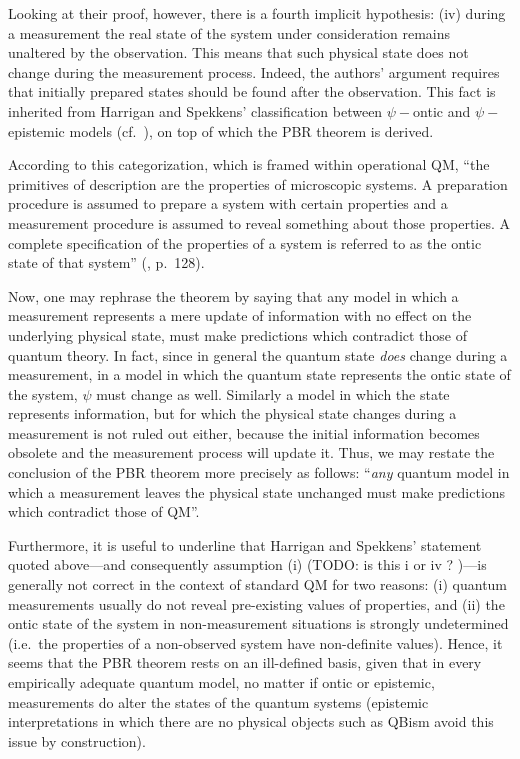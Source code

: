 \documentclass[aps,twocolumn,showpacs,preprintnumbers]{revtex4}
\begin{document}
	Looking at their proof, however, there is a fourth implicit hypothesis: (iv) during a measurement the real state of the system under consideration remains unaltered by the observation. This means that such physical state does not change during the measurement process. Indeed, the authors' argument requires that initially prepared states should be found after the observation. This fact is inherited from Harrigan and Spekkens' classification between $\psi-$ontic and $\psi-$epistemic models (cf.\ \cite{Harrigan:2010}), on top of which the PBR theorem is derived. 
	
	According to this categorization, which is framed within operational QM, ``the primitives of description are the properties of microscopic systems. A preparation procedure is assumed to prepare a system with certain properties and a measurement procedure is assumed to reveal something about those properties. A complete specification of the properties of a system is referred to as the ontic state of that system'' (\cite{Harrigan:2010}, p.\ 128). 
	
	Now, one may rephrase the theorem by saying that any model in which a measurement represents a mere update of information with no effect on the underlying physical state, must make predictions which contradict those of quantum theory. In fact, since in general the quantum state \emph{does} change during a measurement, in a model in which the quantum state represents the ontic state of the system, $\psi$ must change as well. Similarly a model in which the state represents information, but for which the physical state changes during a measurement is not ruled out either, because the initial information becomes obsolete and the measurement process will update it. Thus, we may restate the conclusion of the PBR theorem more precisely as follows: ``\emph{any} quantum model in which a measurement leaves the physical state unchanged must make predictions which contradict those of QM''. 
	
	Furthermore, it is useful to underline that Harrigan and Spekkens' statement quoted above---and consequently assumption (i) (TODO: is this i or iv ? )---is generally not correct in the context of standard QM for two reasons: (i) quantum measurements usually do not reveal pre-existing values of properties, and (ii) the ontic state of the system in non-measurement situations is strongly undetermined (i.e.\ the properties of a non-observed system have non-definite values). Hence, it seems that the PBR theorem rests on an ill-defined basis, given that in every empirically adequate quantum model, no matter if ontic or epistemic, measurements do alter the states of the quantum systems (epistemic interpretations in which there are no physical objects such as QBism avoid this issue by construction). 
	
\end{document}
